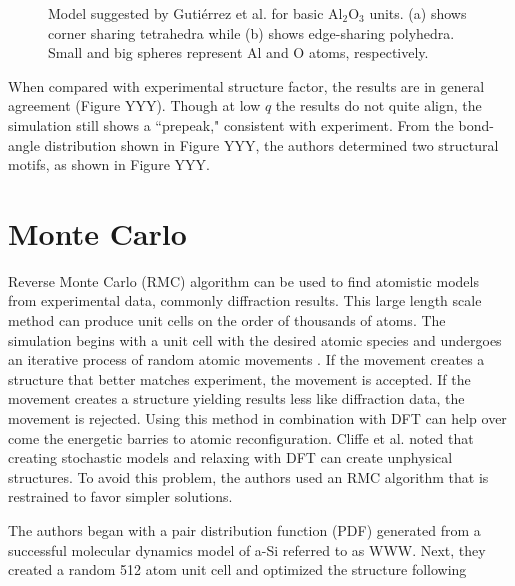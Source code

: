 \documentclass[3p,review,12pt]{elsarticle}
\begin{document}
\begin{figure}[H]
\begin{minipage}[b]{0.45\textwidth}
		\centering
		\caption{Model suggested by Guti\'errez et al. \cite{Gutierrez2002} for basic Al$_{2}$O$_{3}$ units. (a) shows corner sharing tetrahedra while (b) shows edge-sharing polyhedra. Small and big spheres represent Al and O atoms, respectively. }
	\end{minipage}
\end{figure}
\par 
When compared with experimental structure factor, the results are in general agreement (Figure YYY). Though at low $q$ the results do not quite align, the simulation still shows a ``prepeak," consistent with experiment. From the bond-angle distribution shown in Figure YYY, the authors determined two structural motifs, as shown in Figure YYY.


\section{Monte Carlo}
Reverse Monte Carlo (RMC) algorithm can be used to find atomistic models from experimental data, commonly diffraction results. This large length scale method can produce unit cells on the order of thousands of atoms. The simulation begins with a unit cell with the desired atomic species and undergoes an iterative process of random atomic movements \cite{Cliffe2017}. If the movement creates a structure that better matches experiment, the movement is accepted. If the movement creates a structure yielding results less like diffraction data, the movement is rejected. Using this method in combination with DFT can help over come the energetic barries to atomic reconfiguration. Cliffe et al. \cite{Cliffe2017} noted that creating stochastic models and relaxing with DFT can create unphysical structures. To avoid this problem, the authors used an RMC algorithm that is restrained to favor simpler solutions.
\par 
The authors began with a pair distribution function (PDF) generated from a  successful molecular dynamics model of a-Si referred to as WWW. Next, they created a random 512 atom unit cell and optimized the structure following
\end{document}

